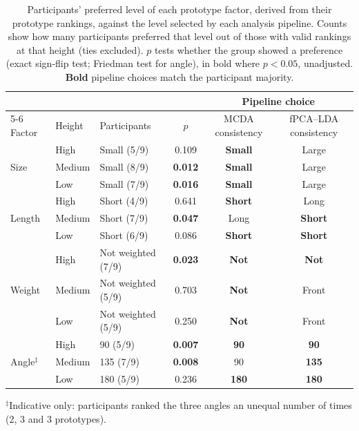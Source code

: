\begin{table}[htbp]
\centering
\small
\caption{Participants' preferred level of each prototype factor, derived from their
prototype rankings, against the level selected by each analysis pipeline. Counts show
how many participants preferred that level out of those with valid rankings at that
height (ties excluded). $p$ tests whether the group showed a preference (exact
sign-flip test; Friedman test for angle), in bold where $p < 0.05$, unadjusted.
\textbf{Bold} pipeline choices match the participant majority.}
\label{tab:participant_pipeline_agreement}
\begin{tabular}{@{}lll c cc@{}}
\toprule
 & & & & \multicolumn{2}{c}{Pipeline choice} \\
\cmidrule(l){5-6}
Factor & Height & Participants & $p$ & MCDA consistency & fPCA--LDA consistency \\
\midrule
\multirow{3}{*}{Size} & High & Small (5/9) & 0.109 & \textbf{Small} & Large \\
 & Medium & Small (8/9) & \textbf{0.012} & \textbf{Small} & Large \\
 & Low & Small (7/9) & \textbf{0.016} & \textbf{Small} & Large \\
\midrule
\multirow{3}{*}{Length} & High & Short (4/9) & 0.641 & \textbf{Short} & Long \\
 & Medium & Short (7/9) & \textbf{0.047} & Long & \textbf{Short} \\
 & Low & Short (6/9) & 0.086 & \textbf{Short} & \textbf{Short} \\
\midrule
\multirow{3}{*}{Weight} & High & Not weighted (7/9) & \textbf{0.023} & \textbf{Not} & \textbf{Not} \\
 & Medium & Not weighted (5/9) & 0.703 & \textbf{Not} & Front \\
 & Low & Not weighted (5/9) & 0.250 & \textbf{Not} & Front \\
\midrule
\multirow{3}{*}{Angle$^{\ddagger}$} & High & 90\textdegree{} (5/9) & \textbf{0.007} & \textbf{90\textdegree{}} & \textbf{90\textdegree{}} \\
 & Medium & 135\textdegree{} (7/9) & \textbf{0.008} & 90\textdegree{} & \textbf{135\textdegree{}} \\
 & Low & 180\textdegree{} (5/9) & 0.236 & \textbf{180\textdegree{}} & \textbf{180\textdegree{}} \\
\bottomrule
\end{tabular}
\par\vspace{1ex}
\footnotesize
$^{\ddagger}$Indicative only: participants ranked the three angles an unequal
number of times (2, 3 and 3 prototypes).
\end{table}
